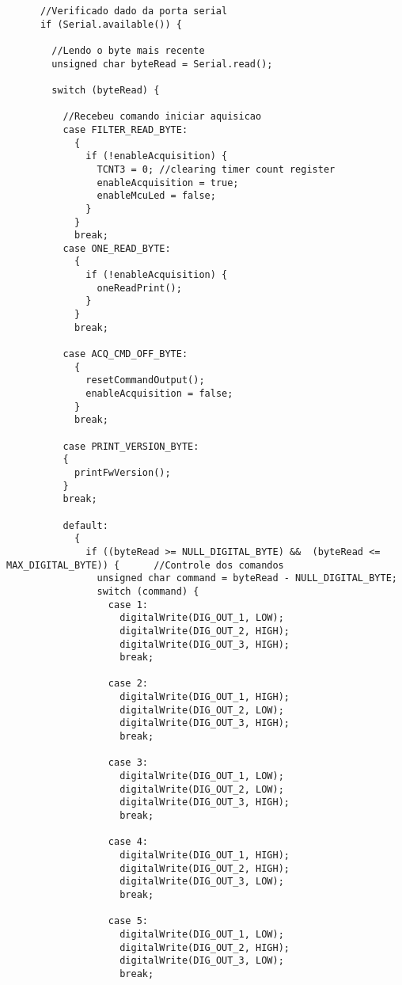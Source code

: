 \begin{lstlisting}
      //Verificado dado da porta serial
      if (Serial.available()) {

        //Lendo o byte mais recente
        unsigned char byteRead = Serial.read();

        switch (byteRead) {

          //Recebeu comando iniciar aquisicao
          case FILTER_READ_BYTE:
            {
              if (!enableAcquisition) {
                TCNT3 = 0; //clearing timer count register
                enableAcquisition = true;
                enableMcuLed = false;
              }
            }
            break;
          case ONE_READ_BYTE:
            {
              if (!enableAcquisition) {
                oneReadPrint();
              }
            }
            break;
            
          case ACQ_CMD_OFF_BYTE:
            {
              resetCommandOutput();
              enableAcquisition = false;
            }
            break;
            
          case PRINT_VERSION_BYTE:
          {
            printFwVersion();
          }
          break;
            
          default:
            {
              if ((byteRead >= NULL_DIGITAL_BYTE) &&  (byteRead <= MAX_DIGITAL_BYTE)) {      //Controle dos comandos
                unsigned char command = byteRead - NULL_DIGITAL_BYTE;
                switch (command) {
                  case 1:
                    digitalWrite(DIG_OUT_1, LOW);
                    digitalWrite(DIG_OUT_2, HIGH);
                    digitalWrite(DIG_OUT_3, HIGH);
                    break;

                  case 2:
                    digitalWrite(DIG_OUT_1, HIGH);
                    digitalWrite(DIG_OUT_2, LOW);
                    digitalWrite(DIG_OUT_3, HIGH);
                    break;

                  case 3:
                    digitalWrite(DIG_OUT_1, LOW);
                    digitalWrite(DIG_OUT_2, LOW);
                    digitalWrite(DIG_OUT_3, HIGH);
                    break;

                  case 4:
                    digitalWrite(DIG_OUT_1, HIGH);
                    digitalWrite(DIG_OUT_2, HIGH);
                    digitalWrite(DIG_OUT_3, LOW);
                    break;

                  case 5:
                    digitalWrite(DIG_OUT_1, LOW);
                    digitalWrite(DIG_OUT_2, HIGH);
                    digitalWrite(DIG_OUT_3, LOW);
                    break;


\end{lstlisting}
